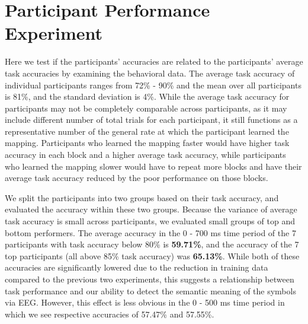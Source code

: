 \section{Participant Performance Experiment}

Here we test if the participants' \tvt accuracies are related to the 
participants' average task accuracies by examining the behavioral data. The 
average task accuracy of individual participants ranges from 72\% - 90\% and 
the mean over all participants is 81\%, and the standard deviation is 4\%.  
While the average task accuracy for participants may not be completely 
comparable across participants, as it may include different number of total 
trials for each participant, it still functions as a representative number of 
the general rate at which the participant learned the mapping. Participants who 
learned the mapping faster would have higher task accuracy in each block and a 
higher average task accuracy, while participants who learned the mapping slower 
would have to repeat more blocks and have their average task accuracy reduced 
by the poor performance on those blocks.

We split the participants into two groups based on their task accuracy, and 
evaluated the \tvt accuracy within these two groups. Because the variance of 
average task accuracy is small across participants, we evaluated small groups 
of top and bottom performers. The average \tvt accuracy in the 0 - 700 ms time 
period of the 7 participants with task accuracy below 80\% is {\bf 59.71\%}, 
and the \tvt accuracy of the 7 top participants (all above 85\% task accuracy) 
was {\bf 65.13\%}. While both of these \tvt accuracies are significantly 
lowered due to the reduction in training data compared to the previous two 
experiments, this suggests a relationship between task performance and our 
ability to detect the semantic meaning of the symbols via EEG. However, this 
effect is less obvious in the 0 - 500 ms time period in which we see respective 
accuracies of 57.47\% and 57.55\%.

